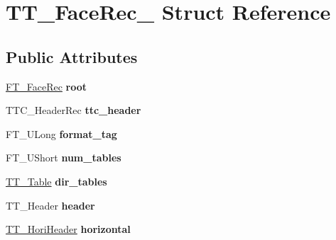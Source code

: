 \hypertarget{struct_t_t___face_rec__}{}\section{T\+T\+\_\+\+Face\+Rec\+\_\+ Struct Reference}
\label{struct_t_t___face_rec__}
\subsection*{Public Attributes}
\begin{DoxyCompactItemize}
\item 
\hyperlink{struct_f_t___face_rec__}{F\+T\+\_\+\+Face\+Rec} {\bfseries root}\hypertarget{struct_t_t___face_rec___ab07a1f6ce2cffe73a5501fb33164ae74}{}\label{struct_t_t___face_rec___ab07a1f6ce2cffe73a5501fb33164ae74}

\item 
T\+T\+C\+\_\+\+Header\+Rec {\bfseries ttc\+\_\+header}\hypertarget{struct_t_t___face_rec___a9cde4ce9550411379eef0791afef8943}{}\label{struct_t_t___face_rec___a9cde4ce9550411379eef0791afef8943}

\item 
F\+T\+\_\+\+U\+Long {\bfseries format\+\_\+tag}\hypertarget{struct_t_t___face_rec___ae492c009d7c3dd1b7279f6596edb84af}{}\label{struct_t_t___face_rec___ae492c009d7c3dd1b7279f6596edb84af}

\item 
F\+T\+\_\+\+U\+Short {\bfseries num\+\_\+tables}\hypertarget{struct_t_t___face_rec___aa32df24e9bbbbc72117bfeb964028b6e}{}\label{struct_t_t___face_rec___aa32df24e9bbbbc72117bfeb964028b6e}

\item 
\hyperlink{struct_t_t___table_rec__}{T\+T\+\_\+\+Table} {\bfseries dir\+\_\+tables}\hypertarget{struct_t_t___face_rec___ae4480c53c6414c74919fc99c9192adfe}{}\label{struct_t_t___face_rec___ae4480c53c6414c74919fc99c9192adfe}

\item 
T\+T\+\_\+\+Header {\bfseries header}\hypertarget{struct_t_t___face_rec___ac5fc04850d7b223029891601ed605b34}{}\label{struct_t_t___face_rec___ac5fc04850d7b223029891601ed605b34}

\item 
\hyperlink{struct_t_t___hori_header__}{T\+T\+\_\+\+Hori\+Header} {\bfseries horizontal}\hypertarget{struct_t_t___face_rec___a784d2ca39e9717da0661f5fd59dffc58}{}\label{struct_t_t___face_rec___a784d2ca39e9717da0661f5fd59dffc58}


\end{DoxyCompactItemize}

